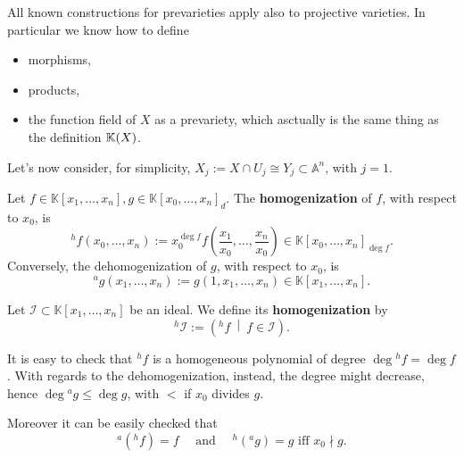 \begin{rem}
	All known constructions for prevarieties apply also to projective varieties.
	In particular we know how to define
	\begin{itemize}
		\item morphisms,
		\item products,
		\item the function field of $X$ as a prevariety, which asctually is the same thing as the definition $\mathbb{K}(X)$.
	\end{itemize}
\end{rem}

Let's now consider, for simplicity, $X_j := X \cap U_j \cong Y_j \subset \mathbb{A}^{n}$, with $j = 1$.
\begin{defn}
	Let $f \in \mathbb{K}\left[x_1, \ldots, x_n \right], g \in \mathbb{K}\left[x_0, \ldots, x_n \right]_d$.
	The \textbf{homogenization} of $f$, with respect to $x_0$, is
	\begin{equation}
		{}^h f \left( x_0, \ldots, x_n \right) := x_0^{\deg f} f \left( \frac{x_1}{x_0}, \ldots, \frac{x_n}{x_0} \right)
		\in \mathbb{K}\left[x_0, \ldots, x_n \right]_{\deg f}
	.\end{equation} 
	Conversely, the dehomogenization of $g$, with respect to $x_0$, is
	\begin{equation}
		{}^a g \left( x_1, \ldots, x_n \right) := g \left( 1, x_1, \ldots, x_n \right) \in \mathbb{K}\left[x_1, \ldots, x_n \right]
	.\end{equation} 
\end{defn}

\begin{defn}
	Let $\mathcal{I} \subset \mathbb{K}\left[x_1, \ldots, x_n \right]$ be an ideal.
	We define its \textbf{homogenization} by
	\begin{equation}
		{}^h \mathcal{I} := \left( {}^h f \ \middle|\ f \in \mathcal{I} \right)
	.\end{equation} 
\end{defn}

\begin{rem}
	It is easy to check that ${}^h f$ is a homogeneous polynomial of degree $\deg {}^h f = \deg f$.
	With regards to the dehomogenization, instead, the degree might decrease, hence
	$\deg {}^a g \leq \deg g$, with $<$ if $x_0$ divides $g$.

	Moreover it can be easily checked that
	\begin{equation}
		{}^a \left( {}^h f \right) = f \quad \text{ and } \quad {}^h \left( {}^a g \right) = g \text{ iff } x_0 \nmid g
	.\end{equation} 
\end{rem}

